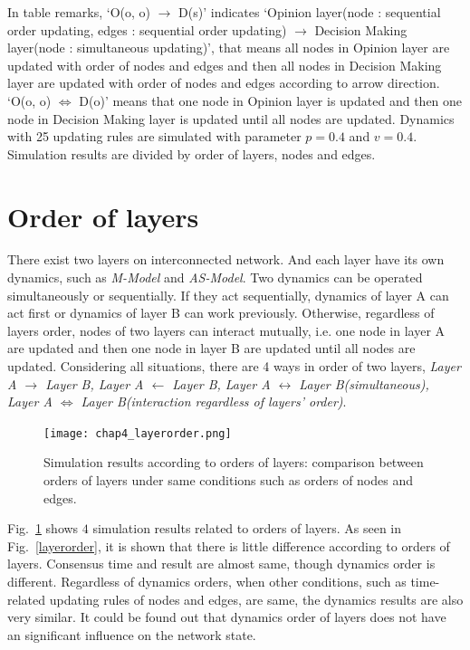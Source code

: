 In table remarks, `O(o, o) $\to$ D(s)' indicates `Opinion layer(node : sequential order updating, edges : sequential order updating) $\to$ Decision Making layer(node : simultaneous updating)', that means all nodes in Opinion layer are updated with order of nodes and edges and then all nodes in Decision Making layer are updated with order of nodes and edges according to arrow direction. `O(o, o) $\Leftrightarrow$ D(o)' means that one node in Opinion layer is updated and then one node in Decision Making layer is updated until all nodes are updated.
Dynamics with 25 updating rules are simulated with parameter $p=0.4$ and $v=0.4$. Simulation results are divided by order of layers, nodes and edges. 

\section{Order of layers}
There exist two layers on interconnected network. And each layer have its own dynamics, such as \textit{M-Model} and \textit{AS-Model}. Two dynamics can be operated simultaneously or sequentially. If they act sequentially, dynamics of layer A can act first or dynamics of layer B can work previously. Otherwise, regardless of layers order, nodes of two layers can interact mutually, i.e. one node in layer A are updated and then one node in layer B are updated until all nodes are updated.  
Considering all situations, there are 4 ways in order of two layers, \textit{Layer A $\to$ Layer B, Layer A $\leftarrow$ Layer B, Layer A $\leftrightarrow$ Layer B(simultaneous), Layer A $\Leftrightarrow$ Layer B(interaction regardless of layers' order)}. 
\begin{figure}[!htb]
	\centering
	\texttt{[image: chap4\_layerorder.png]}
	\caption{Simulation results according to orders of layers: comparison between orders of layers under same conditions such as orders of nodes and edges.}
	\label{chap4_layerorder}
\end{figure}
Fig.~\ref{chap4_layerorder} shows $4$ simulation results related to orders of layers. As seen in Fig.~\ref{layerorder}, it is shown that there is little difference according to orders of layers. Consensus time and result are almost same, though dynamics order is different. Regardless of dynamics orders, when other conditions, such as time-related updating rules of nodes and edges, are same, the dynamics results are also very similar. It could be found out that dynamics order of layers does not have an significant influence on the network state.  

